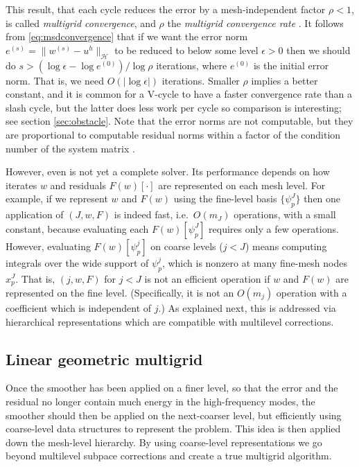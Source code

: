 \documentclass[letterpaper,final,12pt,reqno]{amsart}
\theoremstyle{claim}
\newcommand{\eps}{\epsilon}
\numberwithin{equation}{section}
\numberwithin{figure}{section}
\numberwithin{table}{section}
\numberwithin{theorem}{section}
\begin{document}
This result, that each cycle reduces the error by a mesh-independent factor $\rho<1$, is called \emph{multigrid convergence}, and $\rho$ the \emph{multigrid convergence rate} \cite{Braess2007}.  It follows from \eqref{eq:msdconvergence} that if we want the error norm $e^{(s)} = \|w^{(s)}-u^h\|_{\mathcal{H}}$ to be reduced to below some level $\eps>0$ then we should do $s>(\log\eps - \log e^{(0)})/\log \rho$ iterations, where $e^{(0)}$ is the initial error norm.  That is, we need $O(|\log\eps|)$ iterations.  Smaller $\rho$ implies a better constant, and it is common for a V-cycle to have a faster convergence rate than a slash cycle, but the latter does less work per cycle so comparison is interesting; see section \ref{sec:obstacle}.  Note that the error norms are not computable, but they are proportional to computable residual norms within a factor of the condition number of the system matrix \cite[Chapter 2]{Bueler2016}.

However, even  is not yet a complete solver.  Its performance depends on how iterates $w$ and residuals $F(w)[\cdot]$ are represented on each mesh level.  For example, if we represent $w$ and $F(w)$ using the fine-level basis $\{\psi_p^J\}$ then one application of $(J,w,F)$ is indeed fast, i.e.~$O(m_J)$ operations, with a small constant, because evaluating each $F(w)[\psi_p^J]$ requires only a few operations.  However, evaluating $F(w)[\psi_p^j]$ on coarse levels ($j<J$) means computing integrals over the wide support of $\psi_p^j$, which is nonzero at many fine-mesh nodes $x_p^J$.  That is, $(j,w,F)$ for $j<J$ is not an efficient operation if $w$ and $F(w)$ are represented on the fine level.  (Specifically, it is not an $O(m_j)$ operation with a coefficient which is independent of $j$.)  As explained next, this is addressed via hierarchical representations which are compatible with multilevel corrections.

\subsection*{Linear geometric multigrid}  Once the smoother has been applied on a finer level, so that the error and the residual no longer contain much energy in the high-frequency modes, the smoother should then be applied on the next-coarser level, but efficiently using coarse-level data structures to represent the problem.  This idea is then applied down the mesh-level hierarchy.  By using coarse-level representations we go beyond multilevel subpace corrections and create a true multigrid algorithm.
\end{document}
